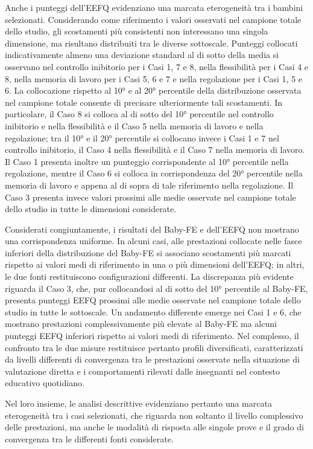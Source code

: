 Anche i punteggi dell'EEFQ evidenziano una marcata eterogeneità tra i bambini selezionati. Considerando come riferimento i valori osservati nel campione totale dello studio, gli scostamenti più consistenti non interessano una singola dimensione, ma risultano distribuiti tra le diverse sottoscale. Punteggi collocati indicativamente almeno una deviazione standard al di sotto della media si osservano nel controllo inibitorio per i Casi 1, 7 e 8, nella flessibilità per i Casi 4 e 8, nella memoria di lavoro per i Casi 5, 6 e 7 e nella regolazione per i Casi 1, 5 e 6. La collocazione rispetto al 10° e al 20° percentile della distribuzione osservata nel campione totale consente di precisare ulteriormente tali scostamenti. In particolare, il Caso 8 si colloca al di sotto del 10° percentile nel controllo inibitorio e nella flessibilità e il Caso 5 nella memoria di lavoro e nella regolazione; tra il 10° e il 20° percentile si collocano invece i Casi 1 e 7 nel controllo inibitorio, il Caso 4 nella flessibilità e il Caso 7 nella memoria di lavoro. Il Caso 1 presenta inoltre un punteggio corrispondente al 10° percentile nella regolazione, mentre il Caso 6 si colloca in corrispondenza del 20° percentile nella memoria di lavoro e appena al di sopra di tale riferimento nella regolazione. Il Caso 3 presenta invece valori prossimi alle medie osservate nel campione totale dello studio in tutte le dimensioni considerate.

Considerati congiuntamente, i risultati del Baby-FE e dell'EEFQ non mostrano una corrispondenza uniforme. In alcuni casi, alle prestazioni collocate nelle fasce inferiori della distribuzione del Baby-FE si associano scostamenti più marcati rispetto ai valori medi di riferimento in una o più dimensioni dell'EEFQ; in altri, le due fonti restituiscono configurazioni differenti. La discrepanza più evidente riguarda il Caso 3, che, pur collocandosi al di sotto del 10° percentile al Baby-FE, presenta punteggi EEFQ prossimi alle medie osservate nel campione totale dello studio in tutte le sottoscale. Un andamento differente emerge nei Casi 1 e 6, che mostrano prestazioni complessivamente più elevate al Baby-FE ma alcuni punteggi EEFQ inferiori rispetto ai valori medi di riferimento. Nel complesso, il confronto tra le due misure restituisce pertanto profili diversificati, caratterizzati da livelli differenti di convergenza tra le prestazioni osservate nella situazione di valutazione diretta e i comportamenti rilevati dalle insegnanti nel contesto educativo quotidiano.

Nel loro insieme, le analisi descrittive evidenziano pertanto una marcata eterogeneità tra i casi selezionati, che riguarda non soltanto il livello complessivo delle prestazioni, ma anche le modalità di risposta alle singole prove e il grado di convergenza tra le differenti fonti considerate.

